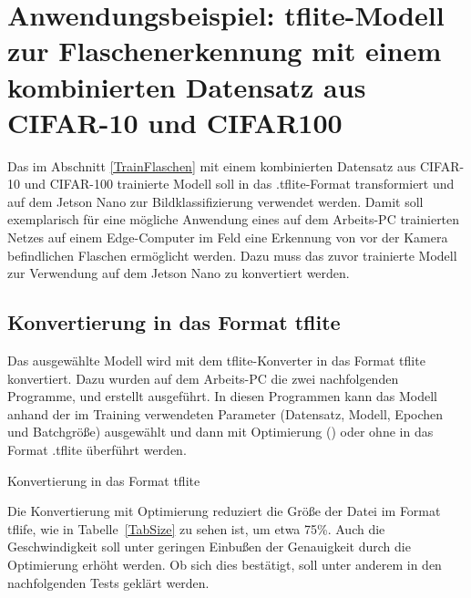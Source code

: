 %
%
%


\section{Anwendungsbeispiel: tflite-Modell zur Flaschenerkennung mit einem kombinierten Datensatz aus CIFAR-10 und CIFAR100}

Das im Abschnitt \ref{TrainFlaschen} 
mit einem kombinierten Datensatz aus CIFAR-10 und CIFAR-100 trainierte Modell soll in das .tflite-Format transformiert und auf dem  Jetson Nano zur Bildklassifizierung verwendet werden. Damit soll exemplarisch für eine mögliche Anwendung eines auf dem Arbeits-PC trainierten Netzes auf einem Edge-Computer im Feld eine Erkennung von vor der Kamera befindlichen Flaschen ermöglicht werden. Dazu muss das zuvor trainierte Modell zur Verwendung auf dem Jetson Nano zu  konvertiert werden.

\subsection{Konvertierung in das Format tflite}

Das ausgewählte Modell wird mit dem tflite-Konverter in das Format tflite konvertiert. Dazu wurden auf dem Arbeits-PC die zwei nachfolgenden Programme,  und  erstellt ausgeführt. In diesen Programmen kann das Modell anhand der im Training verwendeten Parameter (Datensatz, Modell, 
Epochen und Batchgröße) ausgewählt und dann mit Optimierung () oder ohne
in das Format .tflite überführt werden.

\begin{code}
  
  

  \caption{Konvertierung in das Format tflite}
\end{code}

Die Konvertierung mit Optimierung reduziert die Größe der Datei im Format tflife, wie in Tabelle~\ref{TabSize} zu sehen ist, um etwa 75\%. Auch die Geschwindigkeit soll unter geringen Einbußen der Genauigkeit durch die Optimierung erhöht werden. Ob sich dies bestätigt, soll unter anderem in den nachfolgenden Tests geklärt werden.

